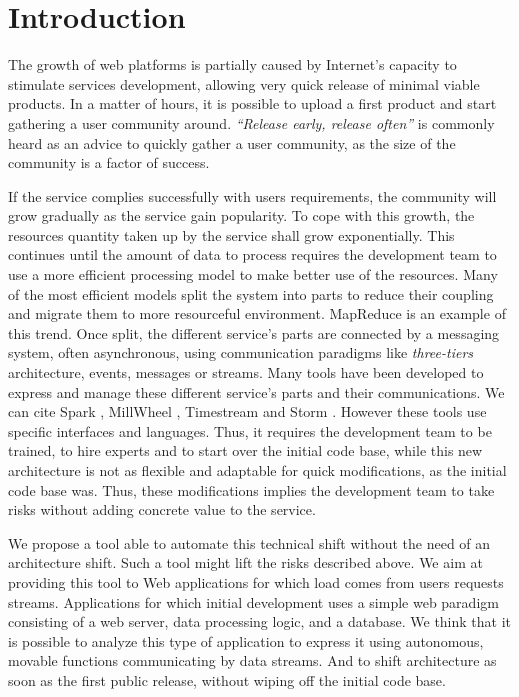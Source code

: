 \section{Introduction}


The growth of web platforms is partially caused by Internet's capacity to stimulate services development, allowing very quick release of minimal viable products.
In a matter of hours, it is possible to upload a first product and start gathering a user community around.
\textit{``Release early, release often''} is commonly heard as an advice to quickly gather a user community, as the size of the community is a factor of success.

If the service complies successfully with users requirements, the community will grow gradually as the service gain popularity.
To cope with this growth, the resources quantity taken up by the service shall grow exponentially.
This continues until the amount of data to process requires the development team to use a more efficient processing model to make better use of the resources.
Many of the most efficient models split the system into parts to reduce their coupling and migrate them to more resourceful environment.
MapReduce \cite{Dean2008} is an example of this trend.
Once split, the different service's parts are connected by a messaging system, often asynchronous, using communication paradigms like \textit{three-tiers} architecture, events, messages or streams.
Many tools have been developed to express and manage these different service's parts and their communications.
We can cite Spark \cite{Zaharia2010}, MillWheel \cite{Akidau2013}, Timestream \cite{Qian2013} and Storm \cite{Marz2011}.
However these tools use specific interfaces and languages.
Thus, it requires the development team to be trained, to hire experts and to start over the initial code base, while this new architecture is not as flexible and adaptable for quick modifications, as the initial code base was.
Thus, these modifications implies the development team to take risks without adding concrete value to the service.

We propose a tool able to automate this technical shift without the need of an architecture shift.
Such a tool might lift the risks described above.
We aim at providing this tool to Web applications for which load comes from users requests streams.
Applications for which initial development uses a simple web paradigm consisting of a web server, data processing logic, and a database.
We think that it is possible to analyze this type of application to express it using autonomous, movable functions communicating by data streams.
And to shift architecture as soon as the first public release, without wiping off the initial code base.

